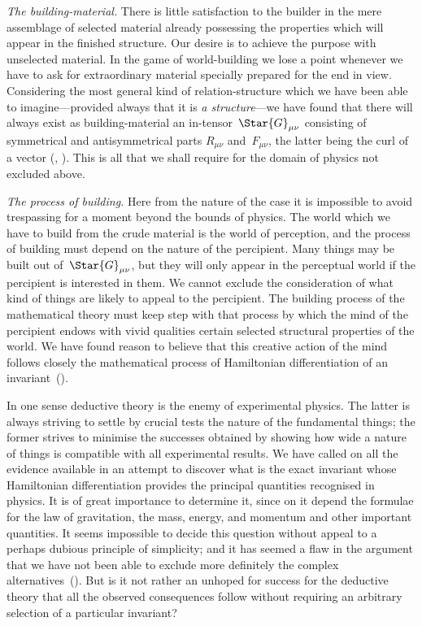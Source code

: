 \documentclass[12pt]{book}
\begin{document}
\emph{The building\hyp{}material.} There is little satisfaction to the builder in the
mere assemblage of selected material already possessing the properties which
will appear in the finished structure. Our desire is to achieve the purpose with
unselected material. In the game of world\hyp{}building we lose a point whenever
we have to ask for extraordinary material specially prepared for the end in
view. Considering the most general kind of relation\hyp{}structure which we have
been able to imagine---provided always that it is \emph{a structure}---we have found
that there will always exist as building\hyp{}material an in\hyp{}tensor~$\Star{G}_{\mu\nu}$ consisting
of symmetrical and antisymmetrical parts $R_{\mu\nu}$ and~$F_{\mu\nu}$, the latter being the
curl of a vector (, ). This is all that we shall require for the domain of
physics not excluded above.

\emph{The process of building.} Here from the nature of the case it is impossible
to avoid trespassing for a moment beyond the bounds of physics. The world
which we have to build from the crude material is the world of perception, and
the process of building must depend on the nature of the percipient. Many
things may be built out of~$\Star{G}_{\mu\nu}$, but they will only appear in the perceptual
%
world if the percipient is interested in them. We cannot exclude the consideration
of what kind of things are likely to appeal to the percipient. The
building process of the mathematical theory must keep step with that process
by which the mind of the percipient endows with vivid qualities certain
selected structural properties of the world. We have found reason to believe
that this creative action of the mind follows closely the mathematical process
of Hamiltonian differentiation of an invariant~().

In one sense deductive theory is the enemy of experimental physics. The
latter is always striving to settle by crucial tests the nature of the fundamental
things; the former strives to minimise the successes obtained by showing how
wide a nature of things is compatible with all experimental results. We have
called on all the evidence available in an attempt to discover what is the exact
invariant whose Hamiltonian differentiation provides the principal quantities
recognised in physics. It is of great importance to determine it, since on it
depend the formulae for the law of gravitation, the mass, energy, and momentum
and other important quantities. It seems impossible to decide this
question without appeal to a perhaps dubious principle of simplicity; and it
%
%
has seemed a flaw in the argument that we have not been able to exclude
more definitely the complex alternatives~(). But is it not rather an unhoped
for success for the deductive theory that all the observed consequences follow
without requiring an arbitrary selection of a particular invariant?
\end{document}
